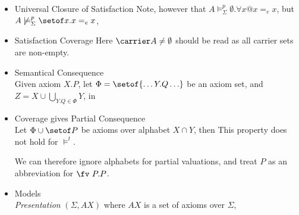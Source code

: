 \begin{itemize}
  \item Universal Closure of Satisfaction
     Note, however that
     $A \models^p_\Sigma \emptyset.\forall x @ x=_e x$,
     but
     $A \not\models^p_\Sigma \setof x. x=_e x$,
  \item Satisfaction Coverage
    Here $\carrier A \neq \emptyset$ should be read as all carrier sets are non-empty.
  \item Semantical Consequence
    \\
    Given axiom $X.P$, let $\Phi = \setof{ \ldots Y.Q \ldots}$ be an axiom set,
    and $Z = X \cup \bigcup_{Y.Q \in \Phi} Y$, in
  \item Coverage gives Partial Consequence
    \\Let $\Phi \cup \setof P$ be axioms over alphabet $X \cap Y$, then
    This property does not hold for $\models^t$.
    \par
    We can therefore ignore alphabets for partial valuations,
    and treat $P$ as an abbreviation for $\fv~P.P$.
  \item Models
    \\\emph{Presentation} $(\Sigma,AX)$ where $AX$ is a set of axioms over $\Sigma$,

\end{itemize}
